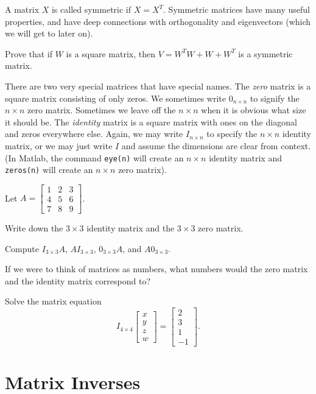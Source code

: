 \documentclass[letter]{article}
\newcommand{\mat}[1]{\begin{bmatrix}#1\end{bmatrix}}
\begin{document}
A matrix $X$ is called symmetric if $X=X^T$.  Symmetric matrices have many useful properties,
and have deep connections with orthogonality and eigenvectors (which we will get to later on).

	\begin{Enum}
		\item Prove that if $W$ is a square matrix, then $V=W^TW+W+W^T$ is a symmetric
		matrix.
	\end{Enum}

There are two very special matrices that have special names.  The \emph{zero} matrix
is a square matrix consisting of only zeros.  We sometimes write $0_{n\times n}$
to signify the $n\times n$ zero matrix.  Sometimes we leave off the $n\times n$
when it is obvious what size it should be.  The \emph{identity} matrix is a square
matrix with ones on the diagonal and zeros everywhere else.  Again, we may write
$I_{n\times n}$ to specify the $n\times n$ identity matrix, or we may just write $I$ and
assume the dimensions are clear from context.  (In Matlab, 
the command {\tt eye(n)} will create an $n\times n$ identity
matrix and {\tt zeros(n)} will create an $n\times n$ zero matrix).

	Let $A=\mat{1&2&3\\4&5&6\\7&8&9}$.
	\begin{Enum}
		\item Write down the $3\times 3$ identity matrix and the $3\times 3$ zero
		matrix.
		\item Compute $I_{3\times 3}A$, $AI_{3\times 3}$, $0_{3\times 3}A$,
		and $A0_{3\times 3}$.
		\item If we were to think of matrices as numbers, what numbers would the
		zero matrix and the identity matrix correspond to?
	\end{Enum}
	\begin{Enum}
		\item Solve the matrix equation
		\[
			I_{4\times 4}\mat{x\\y\\z\\w} = \mat{2\\3\\1\\-1}.
		\]
	\end{Enum}

\newpage
\section*{Matrix Inverses}
\end{document}
